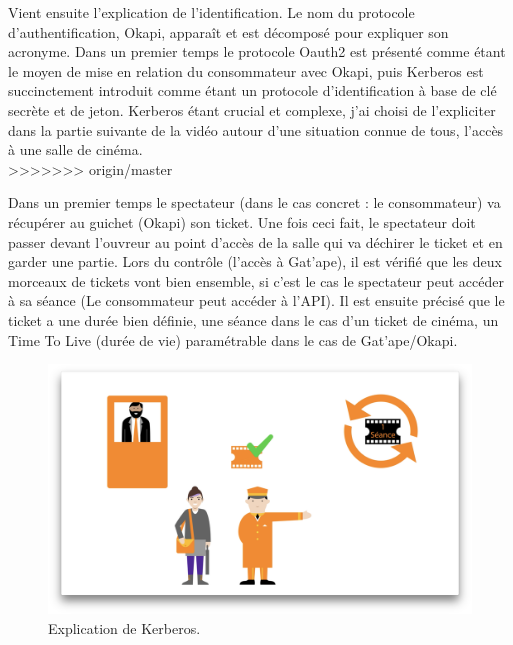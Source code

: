 Vient ensuite l'explication de l'identification. Le nom du protocole d'authentification, Okapi, apparaît et est décomposé pour expliquer son acronyme. Dans un premier temps le protocole Oauth2 est présenté comme étant le moyen de mise en relation du consommateur avec Okapi,  puis Kerberos est succinctement introduit comme étant un protocole d'identification à base de clé secrète et de jeton. Kerberos étant crucial et complexe, j'ai choisi de l'expliciter dans la partie suivante de la vidéo autour d'une situation connue de tous, l'accès à une salle de cinéma.\\
>>>>>>> origin/master

Dans un premier temps le spectateur (dans le cas concret : le consommateur) va récupérer au guichet (Okapi) son ticket. Une fois ceci fait, le spectateur doit passer devant l'ouvreur au point d'accès de la salle qui va déchirer le ticket et en garder une partie. Lors du contrôle (l'accès à Gat'ape), il est vérifié que les deux morceaux de tickets vont bien ensemble, si c'est le cas le spectateur peut accéder à sa séance (Le consommateur peut accéder à l'API). Il est ensuite précisé que le ticket a une durée bien définie, une séance dans le cas d'un ticket de cinéma, un Time To Live (durée de vie) paramétrable dans le cas de Gat'ape/Okapi.\\

\begin{figure}[htp]
  \centering
  \includegraphics[width=15cm]{images/gao/screenGao}
  \caption{Explication de Kerberos.}
  \label{screengatape}
\end{figure}


